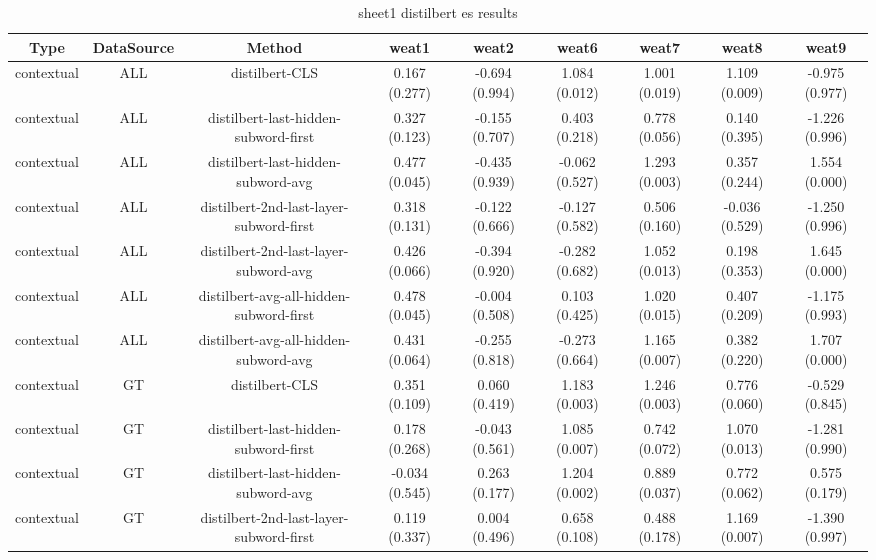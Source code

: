 \begin{sidewaystable}[htb]
    \centering
    \caption{sheet1 distilbert es results}
    \label{appendix_tab:sheet1_distilbert_es_results}
    \small
    \begin{tabular}{@{}ccccccccc@{}}
        \toprule
        Type & DataSource & Method & weat1 & weat2 & weat6 & weat7 & weat8 & weat9 \\
        \midrule
        contextual & ALL & distilbert-CLS & 0.167 (0.277) & -0.694 (0.994) & 1.084 (0.012) & 1.001 (0.019) & 1.109 (0.009) & -0.975 (0.977) \\
        contextual & ALL & distilbert-last-hidden-subword-first & 0.327 (0.123) & -0.155 (0.707) & 0.403 (0.218) & 0.778 (0.056) & 0.140 (0.395) & -1.226 (0.996) \\
        contextual & ALL & distilbert-last-hidden-subword-avg & 0.477 (0.045) & -0.435 (0.939) & -0.062 (0.527) & 1.293 (0.003) & 0.357 (0.244) & 1.554 (0.000) \\
        contextual & ALL & distilbert-2nd-last-layer-subword-first & 0.318 (0.131) & -0.122 (0.666) & -0.127 (0.582) & 0.506 (0.160) & -0.036 (0.529) & -1.250 (0.996) \\
        contextual & ALL & distilbert-2nd-last-layer-subword-avg & 0.426 (0.066) & -0.394 (0.920) & -0.282 (0.682) & 1.052 (0.013) & 0.198 (0.353) & 1.645 (0.000) \\
        contextual & ALL & distilbert-avg-all-hidden-subword-first & 0.478 (0.045) & -0.004 (0.508) & 0.103 (0.425) & 1.020 (0.015) & 0.407 (0.209) & -1.175 (0.993) \\
        contextual & ALL & distilbert-avg-all-hidden-subword-avg & 0.431 (0.064) & -0.255 (0.818) & -0.273 (0.664) & 1.165 (0.007) & 0.382 (0.220) & 1.707 (0.000) \\
        contextual & GT & distilbert-CLS & 0.351 (0.109) & 0.060 (0.419) & 1.183 (0.003) & 1.246 (0.003) & 0.776 (0.060) & -0.529 (0.845) \\
        contextual & GT & distilbert-last-hidden-subword-first & 0.178 (0.268) & -0.043 (0.561) & 1.085 (0.007) & 0.742 (0.072) & 1.070 (0.013) & -1.281 (0.990) \\
        contextual & GT & distilbert-last-hidden-subword-avg & -0.034 (0.545) & 0.263 (0.177) & 1.204 (0.002) & 0.889 (0.037) & 0.772 (0.062) & 0.575 (0.179) \\
        contextual & GT & distilbert-2nd-last-layer-subword-first & 0.119 (0.337) & 0.004 (0.496) & 0.658 (0.108) & 0.488 (0.178) & 1.169 (0.007) & -1.390 (0.997) \\

\end{tabular}
\end{sidewaystable}
